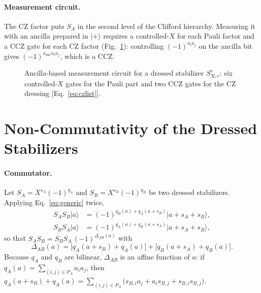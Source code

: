 \documentclass[a4paper]{article}
\newcommand{\rd}{r}
\providecommand{\ket}[1]{\ensuremath{|#1\rangle}}
\begin{document}
\paragraph{Measurement circuit.}
The CZ factor puts $S_A$ in the second level of the Clifford hierarchy. Measuring it with an ancilla prepared in $\ket{+}$ requires a controlled-$X$ for each Pauli factor and a CCZ gate for each CZ factor (Fig.~\ref{fig:xstab_circuit}): controlling $(-1)^{a_ia_j}$ on the ancilla bit gives $(-1)^{a_\mathrm{anc}a_ia_j}$, which is a CCZ.

\begin{figure}
    \centering
    
    \caption{Ancilla-based measurement circuit for a dressed stabilizer $S^{\rd}_{X;v}$: six controlled-$X$ gates for the Pauli part and two CCZ gates for the CZ dressing [Eq.~\eqref{eq:czlist}].}
    \label{fig:xstab_circuit}
\end{figure}

\section{Non-Commutativity of the Dressed Stabilizers}
\label{sec:noncomm}

\paragraph{Commutator.}
Let $S_A=X^{s_A}(-1)^{q_A}$ and $S_B=X^{s_B}(-1)^{q_B}$ be two dressed stabilizers. Applying Eq.~\eqref{eq:generic} twice,
\begin{align}
  S_AS_B\ket{a}&=(-1)^{q_B(a)+q_A(a+s_B)}\ket{a+s_A+s_B},\nonumber\\
  S_BS_A\ket{a}&=(-1)^{q_A(a)+q_B(a+s_A)}\ket{a+s_A+s_B},
\end{align}
so that $S_AS_B=S_BS_A\,(-1)^{\Delta_{AB}(a)}$ with
\begin{equation}
  \Delta_{AB}(a)=\big[q_A(a+s_B)+q_A(a)\big]+\big[q_B(a+s_A)+q_B(a)\big].
  \label{eq:delta}
\end{equation}
Because $q_A$ and $q_B$ are bilinear, $\Delta_{AB}$ is an affine function of $a$: if $q_A(a)=\sum_{(i,j)\in P_A}a_ia_j$, then $q_A(a+s_B)+q_A(a)=\sum_{(i,j)\in P_A}\big(s_{B,i}a_j+a_is_{B,j}+s_{B,i}s_{B,j}\big)$.
\end{document}

